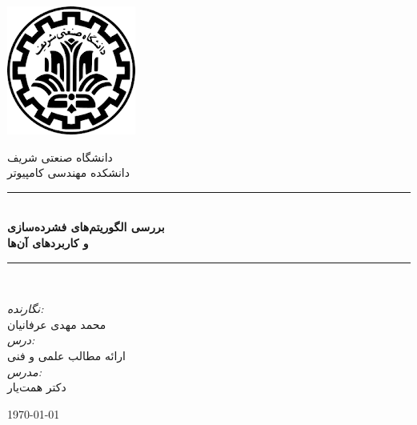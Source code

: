 \newcommand{\HRule}{\rule{\linewidth}{0.1mm}} 
\center %

    \includegraphics[scale=0.5]{figs/sharif.png}%

    \vspace{0.2cm}
    \textsc{ دانشگاه صنعتی شریف}\\[0.2cm] %
    \textsc{ دانشکده مهندسی کامپیوتر}\\[0.2cm]%


\HRule \\[0.4cm]
    { \huge \bfseries بررسی الگوریتم‌های فشرده‌سازی \\و کاربردهای آن‌ها}\\[0.1cm] %
\HRule \\[1.5cm]
 
\begin{minipage}{0.4\textwidth}
\begin{center}

 \large
    
    \emph{نگارنده:}\\
    \Large{محمد مهدی عرفانیان}\\
    \vspace{1cm}
    \emph{درس:\\}
    \Large{ارائه مطالب علمی و فنی}\\[1cm]
    \emph{مدرس:\\}
    {دکتر همت‌یار}
    \end{center}
\end{minipage}
\vspace{30mm}

{\large \today}\\[1cm] %
\vfill %